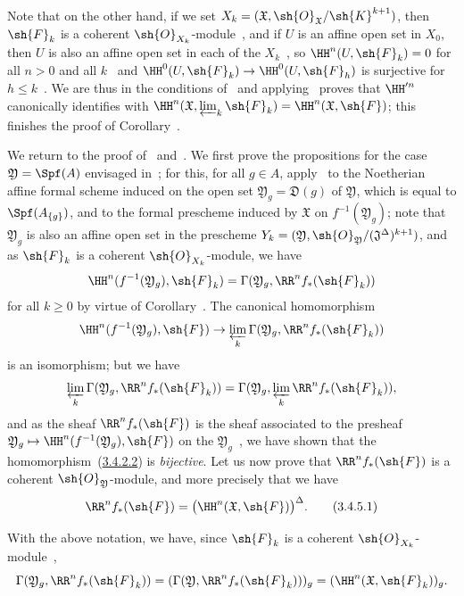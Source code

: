 Note that on the other hand, if we set $X_k=(\mathfrak{X},\sh{O}_\mathfrak{X}/\sh{K}^{k+1})$, then $\sh{F}_k$ is a coherent $\sh{O}_{X_k}$-module~, and if $U$ is an affine open set in $X_0$, then $U$ is also an affine open set in each of the $X_k$~, so $\HH^n(U,\sh{F}_k)=0$ for all $n>0$ and all $k$~ and $\HH^0(U,\sh{F}_k)\to\HH^0(U,\sh{F}_h)$ is surjective for $h\leq k$~.
We are thus in the conditions of~ and applying~ proves that $\HH^{\prime n}$ canonically identifies with $\HH^n(\mathfrak{X},\varprojlim_k\sh{F}_k)=\HH^n(\mathfrak{X},\sh{F})$; this finishes the proof of Corollary~.

\begin{env}[3.4.5]
\label{III.3.4.5}
We return to the proof of~ and~.
We first prove the propositions for the case $\mathfrak{Y}=\Spf(A)$ envisaged in~; for this, for all $g\in A$, apply~ to the Noetherian affine formal scheme induced on the open set $\mathfrak{Y}_g=\mathfrak{D}(g)$ of $\mathfrak{Y}$, which is equal to $\Spf(A_{\{g\}})$, and to the formal prescheme induced by $\mathfrak{X}$ on $f^{-1}(\mathfrak{Y}_g)$; note that $\mathfrak{Y}_g$ is also an affine open set in the prescheme $Y_k=(\mathfrak{Y},\sh{O}_\mathfrak{Y}/(\mathfrak{J}^\Delta)^{k+1})$, and as $\sh{F}_k$ is a coherent $\sh{O}_{X_k}$-module, we have
\[
  \HH^n(f^{-1}(\mathfrak{Y}_g),\sh{F}_k)=\Gamma(\mathfrak{Y}_g,\RR^n f_*(\sh{F}_k))
\]
for all $k\geq 0$ by virtue of Corollary~.
The canonical homomorphism
\[
  \HH^n(f^{-1}(\mathfrak{Y}_g),\sh{F})\to\varprojlim_k\Gamma(\mathfrak{Y}_g,\RR^n f_*(\sh{F}_k))
\]
is an isomorphism; but we have~
\[
  \varprojlim_k\Gamma(\mathfrak{Y}_g,\RR^n f_*(\sh{F}_k))=\Gamma(\mathfrak{Y}_g,\varprojlim_k\RR^n f_*(\sh{F}_k)),
\]
and as the sheaf $\RR^n f_*(\sh{F})$ is the sheaf associated to the presheaf $\mathfrak{Y}_g\mapsto\HH^n(f^{-1}(\mathfrak{Y}_g),\sh{F})$ on the $\mathfrak{Y}_g$~, we have shown that the homomorphism~(\hyperref[III.3.4.2.2]{3.4.2.2}) is \emph{bijective}.
Let us now prove that $\RR^n f_*(\sh{F})$ is a coherent $\sh{O}_\mathfrak{Y}$-module, and more precisely that we have
\[
\label{III.3.4.5.1}
  \RR^n f_*(\sh{F})=\big(\HH^n(\mathfrak{X},\sh{F})\big)^\Delta.
  \tag{3.4.5.1}
\]

With the above notation, we have, since $\sh{F}_k$ is a coherent $\sh{O}_{X_k}$-module~,
\[
  \Gamma(\mathfrak{Y}_g,\RR^n f_*(\sh{F}_k))=(\Gamma(\mathfrak{Y},\RR^n f_*(\sh{F}_k)))_g=(\HH^n(\mathfrak{X},\sh{F}_k))_g.
\]


\end{env}
